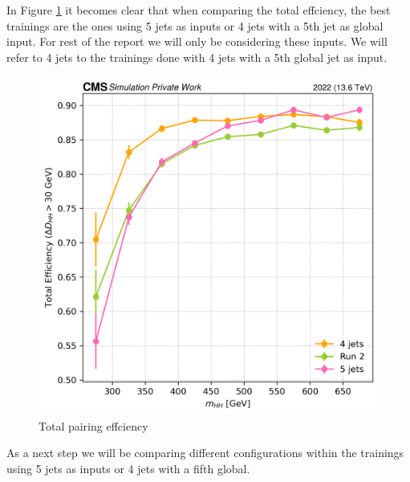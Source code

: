 In Figure \ref{fig:tot eff 4j/5j/4j5g} it becomes clear that when comparing the total effciency, the best trainings are the ones using 5 jets as inputs or 4 jets with a 5th jet as global input. For rest of the report we will only be considering these inputs. We will refer to 4 jets to the trainings done with 4 jets with a 5th global jet as input.

\begin{figure}[hbt]
    \centering
    \includegraphics[width=0.5\linewidth]{Images/6.Improving/Imput Comparisons/Tot Eff 4vs 5 vs R2.png}
    \caption{Total pairing effciency}
    \label{fig:tot eff 4j/5j/4j5g}
\end{figure}

As a next step we will be comparing different configurations within the trainings using 5 jets as inputs or 4 jets with a fifth global. 